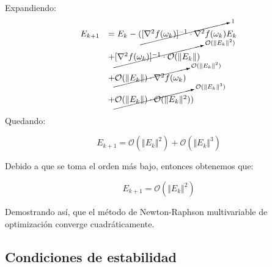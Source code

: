 \documentclass[conference]{IEEEtran}
\begin{document}
Expandiendo:
\begin{equation}
    \begin{array}{cl}
        E_{k+1} &= E_k - (
            \cancelto{1}{[\nabla^2 f(\omega_k)]^{-1} \cdot \nabla^2 f(\omega_k)} E_k \\
        & + \cancelto{\mathcal{O}(\Vert E_k \Vert^2)}{[\nabla^2 f(\omega_k)]^{-1} \cdot \mathcal{O}(\Vert E_k \Vert)} \\
        & +\cancelto{\mathcal{O}(\Vert E_k \Vert^2)}{\mathcal{O}(\Vert E_k \Vert) \cdot \nabla^2 f(\omega_k)} \\
        & + \cancelto{\mathcal{O}(\Vert E_k \Vert^3)}{\mathcal{O}(\Vert E_k \Vert) \cdot \mathcal{O}(\Vert E_k \Vert^2)})
    \end{array}
\end{equation}

Quedando:

\begin{equation}
    E_{k+1} =\mathcal{O}(\Vert E_{k}\Vert ^{2})+\mathcal{O}(\Vert E_{k}\Vert ^{3})
\end{equation}

Debido a que se toma el orden más bajo, entonces obtenemos que:

\begin{equation}
E_{k+1}=\mathcal{O}(\Vert E_{k}\Vert ^{2})
\end{equation}

Demostrando así, que el método de Newton-Raphson multivariable de optimización converge cuadráticamente.

\subsection{Condiciones de estabilidad}
\end{document}
